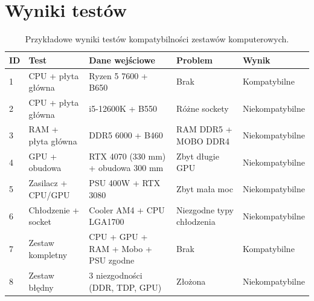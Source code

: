 \documentclass[a4paper,twoside,12pt]{book}
\begin{document}
\section{Wyniki testów}

\begin{table}[H]
\centering
\caption{Przykładowe wyniki testów kompatybilności zestawów komputerowych.}
\label{tab:kompatybilnosc}
\begin{tabular}{|p{0.8cm}|p{2.6cm}|p{3.6cm}|p{3.2cm}|p{2.8cm}|}
\hline
\textbf{ID} & \textbf{Test} & \textbf{Dane wejściowe} & \textbf{Problem} & \textbf{Wynik} \\
\hline
1  & CPU + płyta główna & Ryzen 5 7600 + B650 & Brak & Kompatybilne \\
\hline
2  & CPU + płyta główna & i5-12600K + B550 & Różne sockety & Niekompatybilne \\
\hline
3  & RAM + płyta główna & DDR5 6000 + B460 & RAM DDR5 + MOBO DDR4 & Niekompatybilne \\
\hline
4  & GPU + obudowa & RTX 4070 (330 mm) + obudowa 300 mm & Zbyt długie GPU & Niekompatybilne \\
\hline
5  & Zasilacz + CPU/GPU & PSU 400W + RTX 3080 & Zbyt mała moc & Niekompatybilne \\
\hline
6  & Chłodzenie + socket & Cooler AM4 + CPU LGA1700 & Niezgodne typy chłodzenia & Niekompatybilne \\
\hline
7  & Zestaw kompletny & CPU + GPU + RAM + Mobo + PSU zgodne & Brak & Kompatybilne \\
\hline
8  & Zestaw błędny & 3 niezgodności (DDR, TDP, GPU) & Złożona & Niekompatybilne \\
\hline
\end{tabular}
\end{table}
\end{document}
